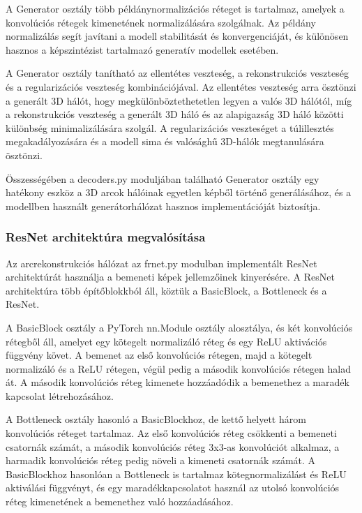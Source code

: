 \documentclass[12pt,a4]{article}
\begin{document}
 A Generator osztály több példánynormalizációs réteget is tartalmaz, amelyek a konvolúciós rétegek kimenetének normalizálására szolgálnak.
 Az példány normalizálás segít javítani a modell stabilitását és konvergenciáját, és különösen hasznos a képszintézist tartalmazó generatív modellek esetében.
 
 A Generator osztály tanítható az ellentétes veszteség, a rekonstrukciós veszteség és a regularizációs veszteség kombinációjával.
Az ellentétes veszteség arra ösztönzi a generált 3D hálót, hogy megkülönböztethetetlen legyen a valós 3D hálótól, míg a rekonstrukciós veszteség a generált 3D háló és az alapigazság 3D háló közötti különbség minimalizálására szolgál. 
 A regularizációs veszteséget a túlillesztés megakadályozására és a modell sima és valósághű 3D-hálók megtanulására ösztönzi.
 
 Összességében a decoders.py moduljában található Generator osztály egy hatékony eszköz a 3D arcok hálóinak egyetlen képből történő generálásához,
 és a modellben használt generátorhálózat hasznos implementációját biztosítja.

     \subsubsection{ResNet architektúra megvalósítása}
     Az arcrekonstrukciós hálózat az frnet.py modulban implementált ResNet architektúrát használja a bemeneti képek jellemzőinek kinyerésére. 
A ResNet architektúra több építőblokkból áll, köztük a BasicBlock, a Bottleneck és a ResNet.

A BasicBlock osztály a PyTorch nn.Module osztály alosztálya, és két konvolúciós rétegből áll, amelyet egy kötegelt normalizáló réteg és egy ReLU aktivációs függvény követ.
 A bemenet az első konvolúciós rétegen, majd a kötegelt normalizáló és a ReLU rétegen, végül pedig a második konvolúciós rétegen halad át. 
 A második konvolúciós réteg kimenete hozzáadódik a bemenethez a maradék kapcsolat létrehozásához.

A Bottleneck osztály hasonló a BasicBlockhoz, de kettő helyett három konvolúciós réteget tartalmaz.
 Az első konvolúciós réteg csökkenti a bemeneti csatornák számát, a második konvolúciós réteg 3x3-as konvolúciót alkalmaz, a harmadik konvolúciós réteg pedig növeli a kimeneti csatornák számát.
A BasicBlockhoz hasonlóan a Bottleneck is tartalmaz kötegnormalizálást és ReLU aktiválási függvényt, és egy maradékkapcsolatot használ az utolsó konvolúciós réteg kimenetének a bemenethez való hozzáadásához.
\end{document}
